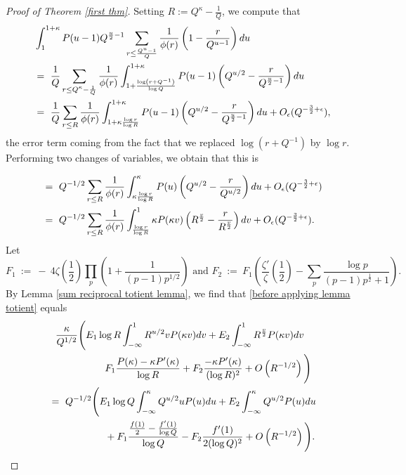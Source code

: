 \documentclass[12pt,reqno]{amsart}
\numberwithin{equation}{section}
\theoremstyle{plain}
\begin{document}
\begin{proof}[Proof of Theorem \ref{first thm}]
Setting $R:= Q^{\kappa} -\frac 1Q$, we compute that
\begin{align}
 &\int_1^{1+\kappa} P(u-1) Q^{\frac u2-1}\sum_{\substack{r\leq \frac {Q^u-1}Q}}\frac 1{\phi(r)} \left(1-\frac r{Q^{u-1}}\right)du \notag \\
&= \ \frac 1Q\sum_{\substack{r\leq Q^{\kappa} -\frac 1Q }}\frac 1{\phi(r)} \int_{1+\frac{\log\left( r+Q^{-1}\right)}{\log Q}}^{1+\kappa}P(u-1)\left(Q^{u/2}-\frac r{Q^{\frac u2-1}}\right)du \notag \\
&= \ \frac 1Q\sum_{\substack{r\leq R }}\frac 1{\phi(r)} \int_{1+\kappa \frac{\log r }{\log R}}^{1+\kappa}P(u-1)\left(Q^{u/2}-\frac r{Q^{\frac u2-1}}\right)du + O_{\epsilon}(Q^{-\frac 32+\epsilon}) \notag,
\end{align}
 the error term coming from the fact that we replaced $\log(r+Q^{-1})$ by $\log r$. Performing two changes of variables, we obtain that this is

\begin{align}
&= \ Q^{-1/2}\sum_{\substack{r\leq R }}\frac 1{\phi(r)} \int_{\kappa \frac{\log r }{\log R}}^{\kappa}P(u)\left(Q^{u/2}-\frac r{Q^{u/2}}\right)du + O_{\epsilon}(Q^{-\frac 32+\epsilon}) \notag  \\
&= \ Q^{-1/2}\sum_{\substack{r\leq R }}\frac 1{\phi(r)} \int_{\frac{\log r }{\log R}}^{1} \kappa P(\kappa v)\left(R^{\frac v2}-\frac r{R^{\frac v2}}\right)dv + O_{\epsilon}(Q^{-\frac 32+\epsilon}). \label{before applying lemma totient}
\end{align}
Let \begin{equation} F_1 \ := \ -\ 4\zeta\left( \frac 12\right) \prod_p \left( 1+\frac 1{(p-1)p^{1/2}}\right) \text{ and } F_2 \ := \ F_1\left( \frac{\zeta'}{\zeta} \left(\frac 12\right) -\sum_p \frac{\log p}{(p-1)p^{\frac 12}+1}\right).\end{equation}
By Lemma \ref{sum reciprocal totient lemma}, we find that \eqref{before applying lemma totient} equals
\begin{align} &\ \ \frac{\kappa}{Q^{1/2}} \Bigg(E_1 \log R  \int_{-\infty}^1 R^{u/2}vP(\kappa v)dv + E_2 \int_{-\infty}^1 R^{\frac v2}P(\kappa v)dv \notag  \\
 &\hspace{2cm} F_1\frac{P(\kappa)-\kappa P'(\kappa)}{\log R}+F_2\frac{-\kappa P'(\kappa)}{(\log R)^2} +O\left( R^{-1/2} \right)\Bigg) \notag \\
&=\ Q^{-1/2} \Bigg(E_1 \log Q  \int_{-\infty}^{\kappa} Q^{u/2}uP(u)du + E_2 \int_{-\infty}^{\kappa} Q^{u/2}P(u)du \notag \\
&\hspace{2cm}+ F_1\frac{\frac{f(1)}2-\frac{f'(1)}{\log Q}}{\log Q}-F_2\frac{f'(1)}{2(\log Q)^2} + O\left( R^{-1/2} \right)\Bigg).
\label{first thing to combine}
\end{align}


\end{proof}
\end{document}
